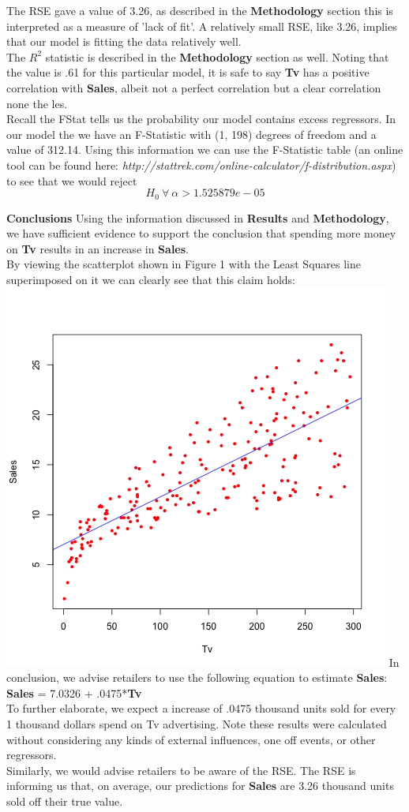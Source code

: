 \documentclass{article}
\begin{document}
The RSE gave a value of 3.26, as described in the \textbf{Methodology} section this is interpreted as a measure of 'lack of fit'. A relatively small RSE, like 3.26, implies that our model is fitting the data relatively well.\\
The $R^{2}$ statistic is described in the \textbf{Methodology} section as well. Noting that the value is .61 for this particular model, it is safe to say \textbf{Tv} has a positive correlation with \textbf{Sales}, albeit not a perfect correlation but a clear correlation none the les.\\
Recall the FStat tells us the probability our model contains excess regressors. In our model the we have an F-Statistic with (1, 198) degrees of freedom and a value of 312.14. Using this information we can use the F-Statistic table (an online tool can be found here: \emph{http://stattrek.com/online-calculator/f-distribution.aspx}) to see that we would reject $$H_{0}\ \forall \ \alpha > 1.525879e-05$$

\textbf{Conclusions}
Using the information discussed in \textbf{Results} and \textbf{Methodology}, we have sufficient evidence to support the conclusion that spending more money on \textbf{Tv} results in an increase in \textbf{Sales}.\\
By viewing the scatterplot shown in Figure 1 with the Least Squares line superimposed on it we can clearly see that this claim holds:
\includegraphics{images/scatterplot-tv-sales.png}
In conclusion, we advise retailers to use the following equation to estimate \textbf{Sales}:
\textbf{Sales} = 7.0326 + .0475*\textbf{Tv} \\
To further elaborate, we expect a increase of .0475 thousand units sold for every 1 thousand dollars spend on Tv advertising. Note these results were calculated without considering any kinds of external influences, one off events, or other regressors.\\
Similarly, we would advise retailers to be aware of the RSE. The RSE is informing us that, on average, our predictions for \textbf{Sales} are 3.26 thousand units sold off their true value.
\end{document}
